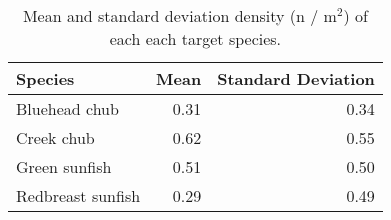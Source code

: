 \begin{table}[ht]
\centering
\caption{Mean and standard deviation density (n / m$^2$) of each each target species.} 
\label{tab:density}
\begin{tabular}{lrr}
  \hline
Species & Mean & Standard Deviation \\ 
  \hline
Bluehead chub & 0.31 & 0.34 \\ 
  Creek chub & 0.62 & 0.55 \\ 
  Green sunfish & 0.51 & 0.50 \\ 
  Redbreast sunfish & 0.29 & 0.49 \\ 
   \hline
\end{tabular}
\end{table}
